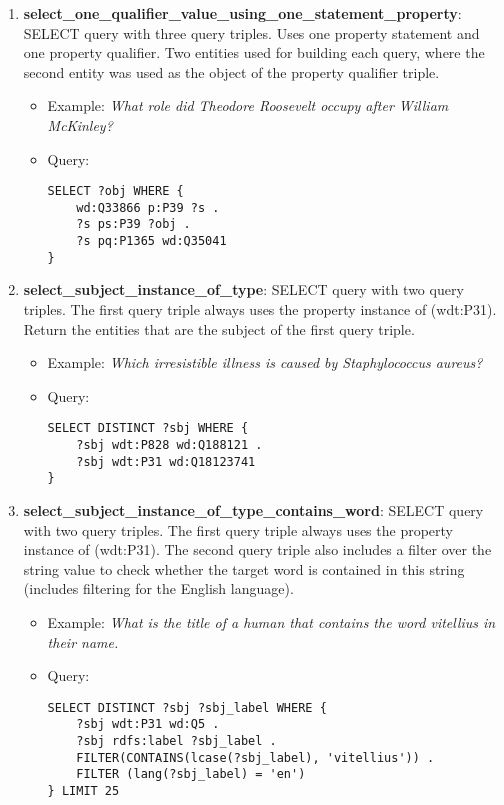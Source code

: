 \begin{enumerate}
    \item \textbf{select\_one\_qualifier\_value\_using\_one\_statement\_property}: SELECT query with three 
    query triples. Uses one property statement and one property qualifier. Two entities used for 
    building each query, where the second entity was used as the object of the property qualifier 
    triple.
    \begin{itemize}
        \item Example: \textit{What role did Theodore Roosevelt occupy after William McKinley?}
        \item Query:
        \begin{lstlisting}[basicstyle=\ttfamily,frame=single]        
SELECT ?obj WHERE { 
    wd:Q33866 p:P39 ?s . 
    ?s ps:P39 ?obj . 
    ?s pq:P1365 wd:Q35041 
}
        \end{lstlisting}
    \end{itemize}
    
    \item \textbf{select\_subject\_instance\_of\_type}: SELECT query with two query triples. The first 
    query triple always uses the property instance of (wdt:P31). Return the entities that are the 
    subject of the first query triple.
    \begin{itemize}
        \item Example: \textit{Which irresistible illness is caused by Staphylococcus aureus?}
        \item Query:
        \begin{lstlisting}[basicstyle=\ttfamily,frame=single]        
SELECT DISTINCT ?sbj WHERE { 
    ?sbj wdt:P828 wd:Q188121 . 
    ?sbj wdt:P31 wd:Q18123741 
}
        \end{lstlisting}
    \end{itemize}
    
    \item \textbf{select\_subject\_instance\_of\_type\_contains\_word}: SELECT query with two query triples. 
    The first query triple always uses the property instance of (wdt:P31). The second query triple 
    also includes a filter over the string value to check whether the target word is contained in 
    this string (includes filtering for the English language).
    \begin{itemize}
        \item Example: \textit{What is the title of a human that contains the word vitellius in their 
        name.}
        \item Query:
        \begin{lstlisting}[basicstyle=\ttfamily,frame=single]        
SELECT DISTINCT ?sbj ?sbj_label WHERE { 
    ?sbj wdt:P31 wd:Q5 . 
    ?sbj rdfs:label ?sbj_label . 
    FILTER(CONTAINS(lcase(?sbj_label), 'vitellius')) . 
    FILTER (lang(?sbj_label) = 'en') 
} LIMIT 25
        \end{lstlisting}
    \end{itemize}
    

\end{enumerate}
